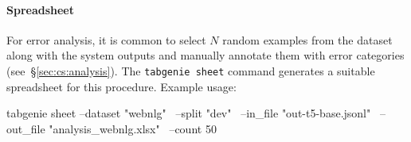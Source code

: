 \paragraph{Spreadsheet} For error analysis, it is common to select $N$ random examples from the dataset along with the system outputs and manually annotate them with error categories (see~§\ref{sec:cs:analysis}). The \texttt{tabgenie sheet} command generates a suitable spreadsheet for this procedure. Example usage:

\begin{python}
    tabgenie sheet --dataset "webnlg" \
    --split "dev" \
    --in_file "out-t5-base.jsonl" \
    --out_file "analysis_webnlg.xlsx" \
    --count 50
\end{python}

